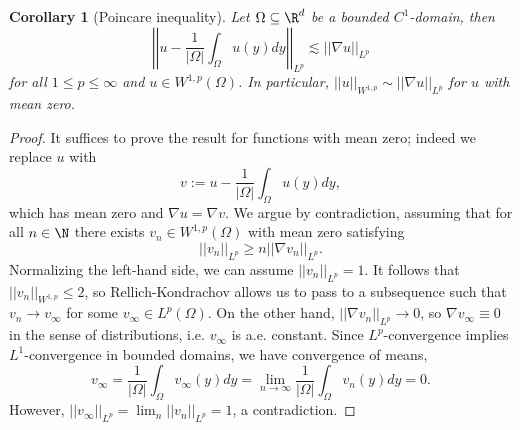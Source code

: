 \documentclass[reqno]{amsart}
\newtheorem{corollary}[theorem]{Corollary}
\theoremstyle{definition}
\theoremstyle{remark}
\begin{document}
\begin{corollary}[Poincare inequality]
	Let $\Omega \subseteq \R^d$ be a bounded $C^1$-domain, then 
		\[ \left|\left| u - \frac{1}{|\Omega|} \int_\Omega u(y) dy \right|\right|_{L^p} \lesssim ||\nabla u||_{L^p} \]
	for all $1 \leq p \leq \infty$ and $u \in W^{1, p} (\Omega)$. In particular, $||u||_{W^{1, p}} \sim ||\nabla u||_{L^p}$ for $u$ with mean zero. 
\end{corollary}

\begin{proof}
	It suffices to prove the result for functions with mean zero; indeed we replace $u$ with
		\[ v:=  u - \frac{1}{|\Omega|} \int_\Omega u(y) dy, \]
	which has mean zero and $\nabla u = \nabla v$. We argue by contradiction, assuming that for all $n \in \N$ there exists $v_n \in W^{1, p} (\Omega)$ with mean zero satisfying 
		\[ ||v_n||_{L^p} \geq n ||\nabla v_n||_{L^p}. \]
	Normalizing the left-hand side, we can assume $||v_n||_{L^p} = 1$. It follows that $|| v_n||_{W^{1, p}} \leq 2$, so Rellich-Kondrachov allows us to pass to a subsequence such that $v_n \to v_\infty$ for some $v_\infty \in L^p (\Omega)$. On the other hand, $||\nabla v_n||_{L^p} \to 0$, so $\nabla v_\infty \equiv 0$ in the sense of distributions, i.e. $v_\infty$ is a.e. constant. Since $L^p$-convergence implies $L^1$-convergence in bounded domains, we have convergence of means,  
		\[ v_\infty =  \frac{1}{|\Omega|} \int_\Omega v_\infty (y) dy = \lim_{n \to \infty} \frac{1}{|\Omega|} \int_\Omega v_n (y) dy = 0.  \]
	However, $||v_\infty||_{L^p} = \lim_n ||v_n||_{L^p} = 1$, a contradiction. 
\end{proof}


 
\end{document}
